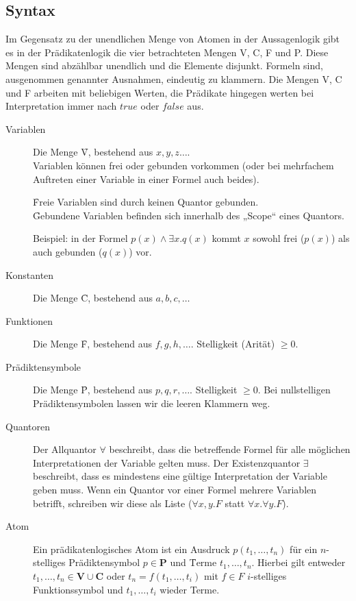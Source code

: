 \subsection{Syntax}
    Im Gegensatz zu der unendlichen Menge von Atomen in der Aussagenlogik gibt es in der Prädikatenlogik die vier betrachteten Mengen V, C, F und P. Diese Mengen sind abzählbar unendlich und die Elemente disjunkt. Formeln sind, ausgenommen genannter Ausnahmen, eindeutig zu klammern. Die Mengen V, C und F arbeiten mit beliebigen Werten, die Prädikate hingegen werten bei Interpretation immer nach $true$ oder $false$ aus. 
    \begin{description}
        \item[Variablen] Die Menge \f{V}, bestehend aus $x, y, z\dots$. \\
            Variablen können frei oder gebunden vorkommen (oder bei mehrfachem Auftreten einer Variable in einer Formel auch beides).

            \f{Freie} Variablen sind durch keinen Quantor gebunden. \\
            \f{Gebundene} Variablen befinden sich innerhalb des „Scope“ eines Quantors.

            Beispiel: in der Formel $p(x) \land \exists x.q(x)$ kommt $x$ sowohl frei ($p(x)$) als auch gebunden ($q(x)$) vor.

        \item[Konstanten] Die Menge \f{C}, bestehend aus $a,b,c,\dots$

        \item[Funktionen] Die Menge \f{F}, bestehend aus $f, g, h, \dots$. Stelligkeit (Arität) $\geq 0$.

        \item[Prädiktensymbole] Die Menge \f{P}, bestehend aus $p,q,r,\dots$. Stelligkeit $\geq 0$. Bei nullstelligen Prädiktensymbolen lassen wir die leeren Klammern weg.

        \item[Quantoren] Der Allquantor $\forall$ beschreibt, dass die betreffende Formel für alle möglichen Interpretationen der Variable gelten muss. Der Existenzquantor $\exists$ beschreibt, dass es mindestens eine gültige Interpretation der Variable geben muss. Wenn ein Quantor vor einer Formel mehrere Variablen betrifft, schreiben wir diese als Liste ($\forall x,y.F$ statt $\forall x.\forall y.F$).

        \item[Atom] Ein prädikatenlogisches Atom ist ein Ausdruck $p(t_{1},\dots,t_{n})$ für ein $n$-stelliges Prädiktensymbol $p \in \mathbf{P}$ und \f{Terme} $t_{1},\dots,t_{n}$. Hierbei gilt entweder $t_{1},\dots,t_{n} \in \mathbf{V} \cup \mathbf{C}$ oder $t_{n} = f(t_{1},\dots,t_{i})$ mit $f \in F$ $i$-stelliges Funktionssymbol und $t_{1},\dots,t_{i}$ wieder Terme.


\end{description}
